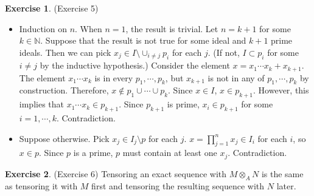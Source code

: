 \documentclass[12pt, psamsfonts]{amsart}
\theoremstyle{definition}
\newtheorem*{exer}{Exercise}
\theoremstyle{remark}
\numberwithin{equation}{section}
\begin{document}
\begin{exer}{(Exercise 5)}
  \begin{itemize}
    \item
      Induction on $n$.
      When $n = 1$, the result is trivial.
      Let $n = k + 1$ for some $k \in \mathbb{N}$.
      Suppose that the result is not true for some ideal and $k + 1$ prime ideals.
      Then we can pick $x_j \in I \setminus \cup_{i \ne j}  p_i$ for each $j$.
      (If not, $I \subset p_i$ for some $i \ne j$ by the inductive hypothesis.)
      Consider the element $x = x_1 \cdots x_k + x_{k + 1}$.
      The element $x_1 \cdots x_k$ is in every $p_1, \cdots, p_k$, but $x_{k + 1}$ is not in any of $p_1, \cdots, p_k$ by construction.
      Therefore, $x \notin p_1 \cup \cdots \cup p_k$.
      Since $x \in I$, $x \in p_{k + 1}$.
      However, this implies that $x_1 \cdots x_k \in p_{k + 1}$.
      Since $p_{k + 1}$ is prime, $x_i \in p_{k + 1}$ for some $i = 1, \cdots, k$.
      Contradiction.
    \item
      Suppose otherwise.
      Pick $x_j \in I_j \setminus p$ for each $j$.
      $x = \prod_{j=1}^{n} x_j \in I_i$ for each $i$, so $x \in p$.
      Since $p$ is a prime, $p$ must contain at least one $x_j$.
      Contradiction.
  \end{itemize}
\end{exer}

\begin{exer}{(Exercise 6)}
  Tensoring an exact sequence with $M \otimes_A N$ is the same as tensoring it with $M$ first and tensoring the resulting sequence with $N$ later.
\end{exer}
\end{document}
